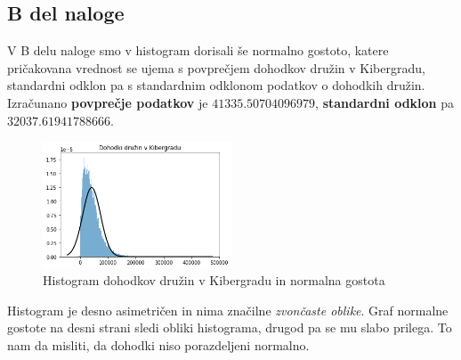 \documentclass{article}
\begin{document}

\subsection{B del naloge}\label{nal1B}

V B delu naloge smo v histogram dorisali še normalno gostoto, katere pričakovana vrednost se ujema s povprečjem
dohodkov družin v Kibergradu, standardni odklon pa s standardnim odklonom podatkov o dohodkih družin.
Izračunano \textbf{povprečje podatkov} je $41335.50704096979$, \textbf{standardni odklon} pa $32037.61941788666$.

\begin{figure}[H]
    \begin{center}
        \includegraphics*[width=0.5\textwidth]{figure1B.png}
        \caption{Histogram dohodkov družin v Kibergradu in normalna gostota}
        \label{1B}
    \end{center}
\end{figure}

Histogram je desno asimetričen in nima značilne \textit{zvončaste oblike}. 
Graf normalne gostote na desni strani sledi obliki histograma, drugod pa se mu slabo prilega.
To nam da misliti, da dohodki niso porazdeljeni normalno.

\end{document}
